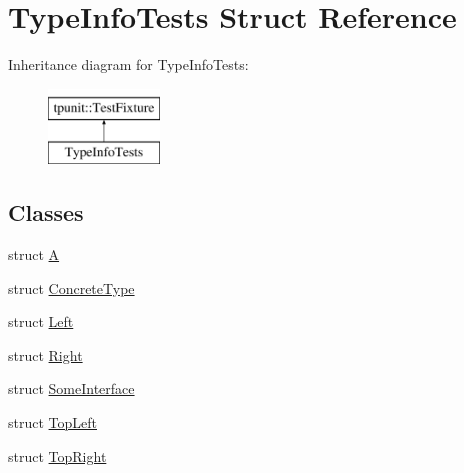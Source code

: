 \hypertarget{structTypeInfoTests}{}\section{Type\+Info\+Tests Struct Reference}
\label{structTypeInfoTests}
Inheritance diagram for Type\+Info\+Tests\+:\begin{figure}[H]
\begin{center}
\leavevmode
\includegraphics[height=2.000000cm]{structTypeInfoTests}
\end{center}
\end{figure}
\subsection*{Classes}
\begin{DoxyCompactItemize}
\item 
struct \mbox{\hyperlink{structTypeInfoTests_1_1A}{A}}
\item 
struct \mbox{\hyperlink{structTypeInfoTests_1_1ConcreteType}{Concrete\+Type}}
\item 
struct \mbox{\hyperlink{structTypeInfoTests_1_1Left}{Left}}
\item 
struct \mbox{\hyperlink{structTypeInfoTests_1_1Right}{Right}}
\item 
struct \mbox{\hyperlink{structTypeInfoTests_1_1SomeInterface}{Some\+Interface}}
\item 
struct \mbox{\hyperlink{structTypeInfoTests_1_1TopLeft}{Top\+Left}}
\item 
struct \mbox{\hyperlink{structTypeInfoTests_1_1TopRight}{Top\+Right}}
\end{DoxyCompactItemize}
